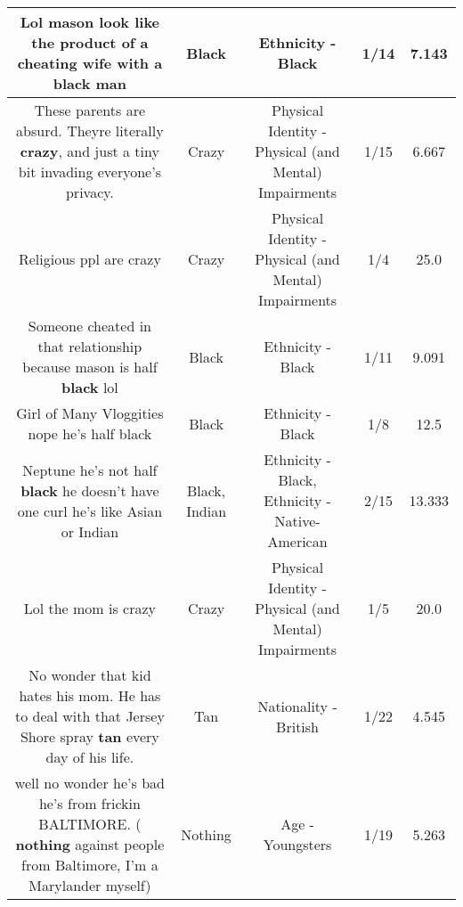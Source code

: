 \documentclass[11pt]{article}
\newlength\mylength
\begin{document}
\begin{center}
\begin{longtable}{|C{.65\mylength}|C{.30\mylength}|C{.12\mylength}|C{.12\mylength}|C{.12\mylength}|}
  \small Lol mason look like the product of a cheating wife with a \textbf{black} man\normalsize   & Black & Ethnicity - Black & 1/14 & 7.143 \\  \hline
  \small These parents are absurd.  Theyre literally \textbf{crazy}, and just a tiny bit invading everyone's privacy.\normalsize   & Crazy & Physical Identity - Physical (and Mental) Impairments & 1/15 & 6.667 \\  \hline
  \small Religious ppl are crazy\normalsize   & Crazy & Physical Identity - Physical (and Mental) Impairments & 1/4 & 25.0 \\  \hline
  \small Someone cheated in that relationship because mason is half \textbf{black} lol\normalsize   & Black & Ethnicity - Black & 1/11 & 9.091 \\  \hline
  \small Girl of Many Vloggities nope he's half black\normalsize   & Black & Ethnicity - Black & 1/8 & 12.5 \\  \hline
  \small Neptune he's not half \textbf{black} he doesn't have one curl he's like Asian or Indian\normalsize   & Black, Indian & Ethnicity - Black, Ethnicity - Native-American & 2/15 & 13.333 \\  \hline
  \small Lol the mom is crazy\normalsize   & Crazy & Physical Identity - Physical (and Mental) Impairments & 1/5 & 20.0 \\  \hline
  \small No wonder that kid hates his mom. He has to deal with that Jersey Shore spray \textbf{tan} every day of his life.\normalsize   & Tan & Nationality - British & 1/22 & 4.545 \\  \hline
  \small well no wonder he's bad he's from frickin BALTIMORE. ( \textbf{nothing} against people from Baltimore, I'm a Marylander myself)\normalsize   & Nothing & Age - Youngsters & 1/19 & 5.263 \\  \hline

\end{longtable}
\end{center}
\end{document}
